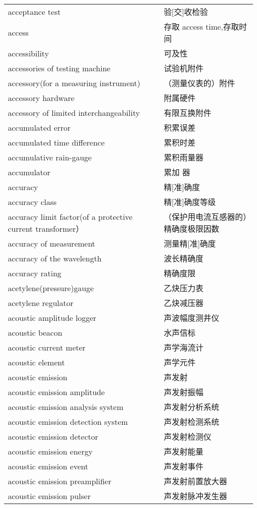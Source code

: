 \documentclass[
]{article}
\begin{document}
\begin{longtable}[]{@{}ll@{}}
acceptance test & 验{[}交{]}收检验 \\
access & 存取 access time,存取时间 \\
accessibility & 可及性 \\
accessories of testing machine & 试验机附件 \\
accessory(for a measuring instrument) & （测量仪表的）附件 \\
accessory hardware & 附属硬件 \\
accessory of limited interchangeability & 有限互换附件 \\
accumulated error & 积累误差 \\
accumulated time difference & 累积时差 \\
accumulative rain-gauge & 累积雨量器 \\
accumulator & 累加 器 \\
accuracy & 精{[}准{]}确度 \\
accuracy class & 精{[}准{]}确度等级 \\
accuracy limit factor(of a protective current transformer） &
（保护用电流互感器的）精确度极限因数 \\
accuracy of measurement & 测量精{[}准{]}确度 \\
accuracy of the wavelength & 波长精确度 \\
accuracy rating & 精确度限 \\
acetylene(pressure)gauge & 乙炔压力表 \\
acetylene regulator & 乙炔减压器 \\
acoustic amplitude logger & 声波幅度测井仪 \\
acoustic beacon & 水声信标 \\
acoustic current meter & 声学海流计 \\
acoustic element & 声学元件 \\
acoustic emission & 声发射 \\
acoustic emission amplitude & 声发射振幅 \\
acoustic emission analysis system & 声发射分析系统 \\
acoustic emission detection system & 声发射检测系统 \\
acoustic emission detector & 声发射检测仪 \\
acoustic emission energy & 声发射能量 \\
acoustic emission event & 声发射事件 \\
acoustic emission preamplifier & 声发射前置放大器 \\
acoustic emission pulser & 声发射脉冲发生器 \\

\end{longtable}
\end{document}
